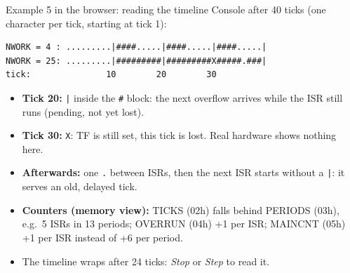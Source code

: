 \begin{frame}[fragile]{Example 5 in the browser: reading the timeline}
  \footnotesize
  Console after 40 ticks (one character per tick, starting at tick 1):
\begin{verbatim}
NWORK = 4 : .........|####.....|####.....|####.....|
NWORK = 25: .........|#########|#########X#####.###|
tick:               10        20        30
\end{verbatim}
  \begin{itemize}
    \item \textbf{Tick 20:} \texttt{|} inside the \texttt{\#} block: the next overflow arrives while the ISR still runs (pending, not yet lost).
    \item \textbf{Tick 30:} \texttt{X}: TF is still set, this tick is lost. Real hardware shows nothing here.
    \item \textbf{Afterwards:} one \texttt{.} between ISRs, then the next ISR starts without a \texttt{|}: it serves an old, delayed tick.
    \item \textbf{Counters (memory view):} TICKS (02h) falls behind PERIODS (03h), e.g.\ 5 ISRs in 13 periods; OVERRUN (04h) +1 per ISR; MAINCNT (05h) +1 per ISR instead of +6 per period.
    \item The timeline wraps after 24 ticks: \emph{Stop} or \emph{Step} to read it.
  \end{itemize}
\end{frame}

